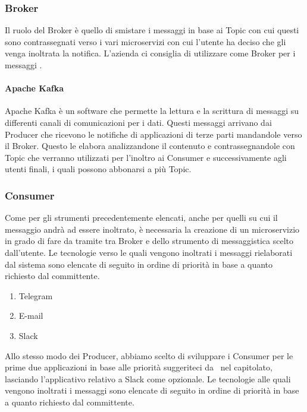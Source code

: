 		
	\subsubsection{Broker}
	
		Il ruolo del Broker è quello di smistare i messaggi in base ai Topic con cui questi sono contrassegnati verso i vari microservizi con cui l'utente ha deciso che gli venga inoltrata la notifica.
		L'azienda ci consiglia di utilizzare come Broker per i messaggi .
	
		\paragraph{Apache Kafka}
		Apache Kafka è un software  che permette la lettura e la scrittura di messaggi su differenti canali di comunicazioni per i dati.
		Questi messaggi arrivano dai Producer che ricevono le notifiche di applicazioni di terze parti mandandole verso il Broker. Questo le elabora analizzandone il contenuto e contrassegnandole con Topic che verranno utilizzati per l'inoltro ai Consumer e successivamente agli utenti finali, i quali possono abbonarsi a più Topic.
	
	\subsubsection{Consumer}
		Come per gli strumenti precedentemente elencati, anche per quelli su cui il messaggio andrà ad essere inoltrato, è necessaria la creazione di un microservizio in grado di fare da tramite tra Broker e  dello strumento di messaggistica scelto dall'utente.
		Le tecnologie verso le quali vengono inoltrati i messaggi rielaborati dal sistema sono elencate di seguito in ordine di priorità in base a quanto richiesto dal committente.
		\begin{enumerate}
			\item Telegram
			\item E-mail
			\item Slack
		\end{enumerate}
		Allo stesso modo dei Producer, abbiamo scelto di sviluppare i Consumer per le prime due applicazioni in base alle priorità suggeriteci da \II\ nel capitolato, lasciando l'applicativo relativo a Slack come opzionale.
		Le tecnologie alle quali vengono inoltrati i messaggi sono elencate di seguito in ordine di priorità in base a quanto richiesto dal committente.
			
